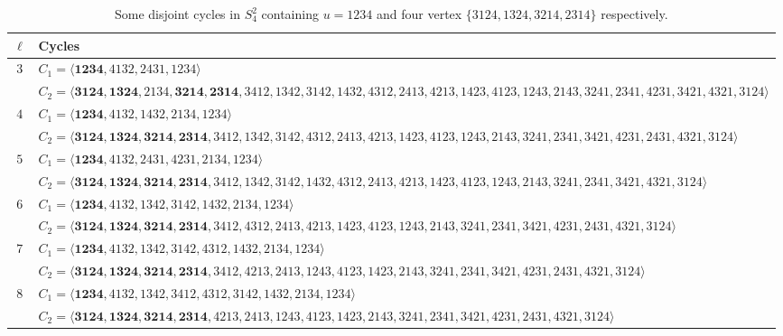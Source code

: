 \documentclass[12pt,a4paper]{amsart}
\newcounter{foo}[subsection]
\theoremstyle{definition}
\begin{document}
\begin{table}[htbp]
\centering
\begin{adjustbox}{angle=90,max height=\textheight} %
\begin{minipage}{\textheight} %
\centering
\caption{Some disjoint cycles in $S_4^2$ containing $u=1234$ and four vertex $\{3124,1324,3214,2314\}$ respectively.}
\label{3-12}

\footnotesize
\setlength{\tabcolsep}{2pt}
\renewcommand{\arraystretch}{0.9}

\begin{tabular}{@{}c l@{}}
\toprule
$\ell$ & Cycles \\
\midrule

$3$ &
$C_1=\langle\mathbf{1234},4132,2431,1234\rangle$\\
&
$C_2=\langle\mathbf{3124,1324},2134,\mathbf{3214,2314},3412,1342,3142,1432,4312,2413,4213,1423,4123,1243,2143,3241,2341,4231,3421,4321,3124\rangle$
\\
\midrule

$4$ &
$C_1=\langle\mathbf{1234},4132,1432,2134,1234\rangle$\\
&
$C_2=\langle\mathbf{3124,1324,3214,2314},3412,1342,3142,4312,2413,4213,1423,4123,1243,2143,3241,2341,3421,4231,2431,4321,3124\rangle$
\\
\midrule

$5$ &
$C_1=\langle\mathbf{1234},4132,2431,4231,2134,1234\rangle$\\
&
$C_2=\langle\mathbf{3124,1324,3214,2314},3412,1342,3142,1432,4312,2413,4213,1423,4123,1243,2143,3241,2341,3421,4321,3124\rangle$
\\
\midrule

$6$ &
$C_1=\langle\mathbf{1234},4132,1342,3142,1432,2134,1234\rangle$\\
&
$C_2=\langle\mathbf{3124,1324,3214,2314},3412,4312,2413,4213,1423,4123,1243,2143,3241,2341,3421,4231,2431,4321,3124\rangle$
\\\midrule

$7$ &
$C_1=\langle\mathbf{1234},4132,1342,3142,4312,1432,2134,1234\rangle$\\
&
$C_2=\langle\mathbf{3124,1324,3214,2314},3412,4213,2413,1243,4123,1423,2143,3241,2341,3421,4231,2431,4321,3124\rangle$
\\\midrule

$8$ &
$C_1=\langle\mathbf{1234},4132,1342,3412,4312,3142,1432,2134,1234\rangle$\\
&
$C_2=\langle\mathbf{3124,1324,3214,2314},4213,2413,1243,4123,1423,2143,3241,2341,3421,4231,2431,4321,3124\rangle$
\\\midrule


\end{tabular}
\end{minipage}
\end{adjustbox}
\end{table}
\end{document}
